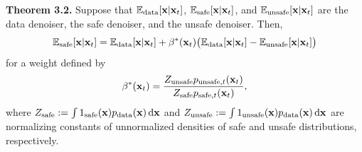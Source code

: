 \begin{mydefinitionbox}
{%
        \renewcommand{\thedummylabelcounter}{3.2}%
        \label{thm:safe}%
    }%
    \noindent\textbf{Theorem 3.2.} Suppose that $\mathbb{E}_{\textup{data}}[\mathbf{x}\vert\mathbf{x}_{t}]$, $\mathbb{E}_{\textup{safe}}[\mathbf{x}\vert\mathbf{x}_{t}]$, and $\mathbb{E}_{\textup{unsafe}}[\mathbf{x}\vert\mathbf{x}_{t}]$ are the data denoiser, the safe denoiser, and the unsafe denoiser. Then,
    \begin{align}\label{eq:E_safe}
        \mathbb{E}_{\textup{safe}}[\mathbf{x}\vert\mathbf{x}_{t}]=\mathbb{E}_{\textup{data}}[\mathbf{x}\vert\mathbf{x}_{t}]+\beta^{*}(\mathbf{x}_{t})\big(\mathbb{E}_{\textup{data}}[\mathbf{x}\vert\mathbf{x}_{t}]-\mathbb{E}_{\textup{unsafe}}[\mathbf{x}\vert\mathbf{x}_{t}]\big)
    \end{align}
    for a weight defined by
    \begin{align}\label{eq:beta}
        \beta^{*}(\mathbf{x}_{t}) = \frac{Z_{\textup{unsafe}}p_{\textup{unsafe},t}(\mathbf{x}_{t})}{Z_{\textup{safe}}p_{\textup{safe},t}(\mathbf{x}_{t})},
    \end{align}
    where $Z_{\textup{safe}}:=\int 1_{\textup{safe}}(\mathbf{x})p_{\textup{data}}(\mathbf{x})\mathop{}\!\mathrm{d}\mathbf{x}$ and $Z_{\textup{unsafe}}:=\int 1_{\textup{unsafe}}(\mathbf{x})p_{\textup{data}}(\mathbf{x})\mathop{}\!\mathrm{d}\mathbf{x}$ are normalizing constants of unnormalized densities of safe and unsafe distributions, respectively.
\end{mydefinitionbox}




